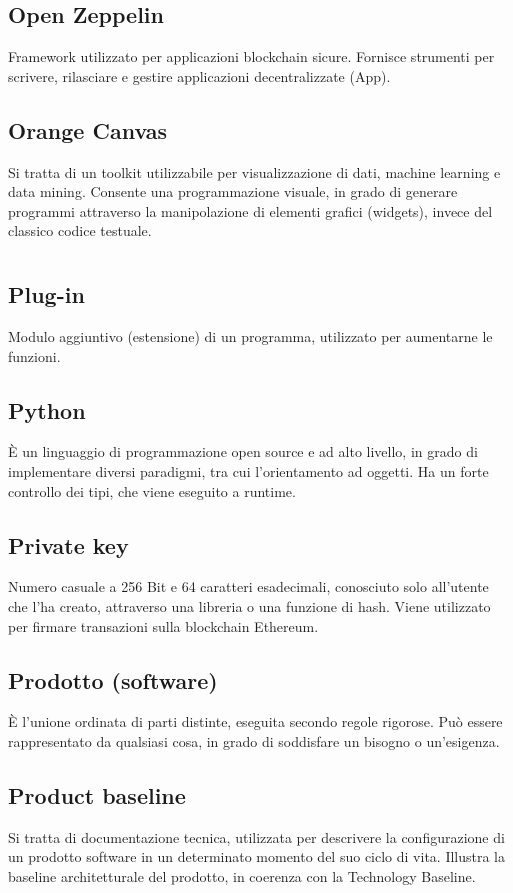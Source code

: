 	\subsection*{Open Zeppelin}
	Framework utilizzato per applicazioni blockchain sicure. Fornisce strumenti per scrivere, rilasciare e gestire applicazioni decentralizzate (\DJ{}App).
	\subsection*{Orange Canvas}
	Si tratta di un toolkit utilizzabile per visualizzazione di dati, machine learning e data mining. Consente una programmazione visuale, in grado di generare programmi attraverso la manipolazione di elementi grafici (widgets), invece del classico codice testuale.
\pagebreak
\section[P]{}
	\subsection*{Plug-in}
	Modulo aggiuntivo (estensione) di un programma, utilizzato per aumentarne le funzioni.
	\subsection*{Python}
	È un linguaggio di programmazione open source e ad alto livello, in grado di implementare diversi paradigmi, tra cui l’orientamento ad oggetti. Ha un forte controllo dei tipi, che viene eseguito a runtime.
	\subsection*{Private key}
	Numero casuale a 256 Bit e 64 caratteri esadecimali, conosciuto solo all’utente che l’ha creato, attraverso una libreria o una funzione di hash. Viene utilizzato per firmare transazioni sulla blockchain Ethereum.
	\subsection*{Prodotto (software)}
	È l’unione ordinata di parti distinte, eseguita secondo regole rigorose. Può essere rappresentato da qualsiasi cosa, in grado di soddisfare un bisogno o un’esigenza.
	\subsection*{Product baseline}
	Si tratta di documentazione tecnica, utilizzata per descrivere la configurazione di un prodotto software in un determinato momento del suo ciclo di vita. Illustra la baseline architetturale del prodotto, in coerenza con la Technology Baseline.
